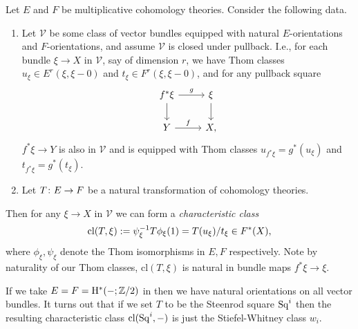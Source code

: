 \renewcommand{\V}{\mathcal{V}}
\newcommand{\cl}{\mathrm{cl}}
\begin{nothing}
  \label{chclass-general}
  Let $E$ and $F$ be multiplicative cohomology theories. Consider the
  following data.
  \begin{enumerate}
  \item Let $\V$ be some class of vector bundles equipped with natural
    $E$-orientations and $F$-orientations, and assume $\V$ is closed
    under pullback. I.e., for each bundle $\xi \to X$ in $\V$, say of
    dimension $r$, we have Thom classes $u_\xi \in E^r(\xi,\xi-0)$ and
    $t_\xi \in F^r(\xi,\xi-0)$, and for any pullback square
    \[
    \begin{tikzcd}
      f^*\xi \rar{g} \dar & \xi \dar \\ Y \rar{f} & X,
    \end{tikzcd}
    \]
    $f^*\xi \to Y$ is also in $\V$ and is equipped with Thom classes
    $u_{f^*\xi} = g^*(u_\xi)$ and $t_{f^*\xi} = g^*(t_\xi)$.
  \item Let $T \colon E \to F$ be a natural transformation of cohomology
    theories.
  \end{enumerate}
  Then for any $\xi \to X$ in $\V$ we can form a \emph{characteristic
    class}
  \[
  \cl(T,\xi) \ce \psi_\xi^{-1}T\phi_\xi(1) = T(u_\xi)/t_\xi \in
  F^*(X),
  \]
  where $\phi_\xi,\psi_\xi$ denote the Thom isomorphisms in $E,F$
  respectively. Note by naturality of our Thom classes, $\cl(T,\xi)$
  is natural in bundle maps $f^*\xi \to \xi$.
\end{nothing}

\begin{example}
  \label{stiefel-whitney}
  If we take $E = F = \mathrm{H}^*(-;\mathbb{Z}/2)$ in  then we
  have natural orientations on all vector bundles. It turns out that
  if we set $T$ to be the Steenrod square $\operatorname{Sq}^i$ then the resulting
  characteristic class $\cl(\Sq^i,-)$ is just the Stiefel-Whitney
  class $w_i$.
\end{example}

